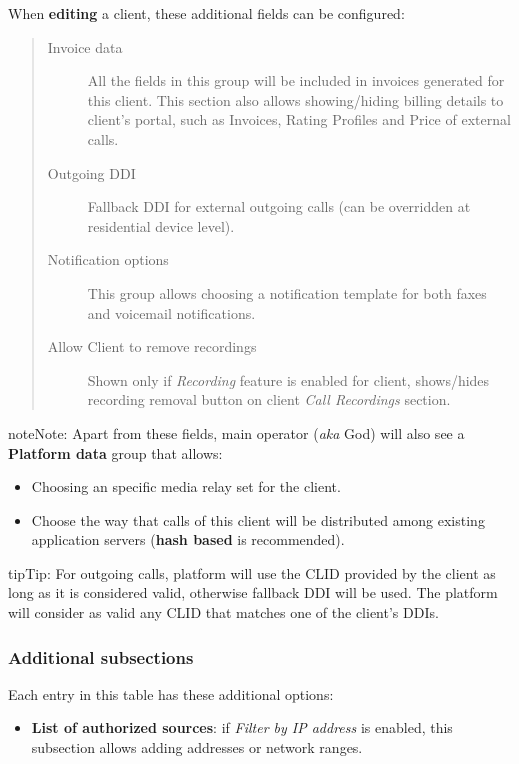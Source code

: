 \documentclass[letterpaper,10pt,english]{sphinxmanual}
\begin{document}
When \textbf{editing} a client, these additional fields can be configured:
\begin{quote}
\begin{description}
\item[{Invoice data}] \leavevmode
All the fields in this group will be included in invoices generated for this client. This section also allows
showing/hiding billing details to client's portal, such as Invoices, Rating Profiles and Price of external calls.

\item[{Outgoing DDI}] \leavevmode
Fallback DDI for external outgoing calls (can be overridden at residential device level).

\item[{Notification options}] \leavevmode
This group allows choosing a notification template for both faxes and voicemail notifications.

\item[{Allow Client to remove recordings}] \leavevmode
Shown only if \emph{Recording} feature is enabled for client, shows/hides recording
removal button on client \emph{Call Recordings} section.

\end{description}
\end{quote}

\begin{notice}{note}{Note:}
Apart from these fields, main operator (\emph{aka} God) will also see a \textbf{Platform data} group that allows:
\begin{itemize}
\item {} 
Choosing an specific media relay set for the client.

\item {} 
Choose the way that calls of this client will be distributed among existing application servers (\textbf{hash based} is recommended).

\end{itemize}
\end{notice}

\begin{notice}{tip}{Tip:}
For outgoing calls, platform will use the CLID provided by the client as long as it is considered valid, otherwise fallback DDI
will be used. The platform will consider as valid any CLID that matches one of the client's DDIs.
\end{notice}


\subsubsection{Additional subsections}
\label{administration_portal/brand/clients/residential:additional-subsections}
Each entry in this table has these additional options:
\begin{itemize}
\item {} 
\textbf{List of authorized sources}: if \emph{Filter by IP address} is enabled, this subsection allows adding addresses or network ranges.

\end{itemize}
\end{document}
